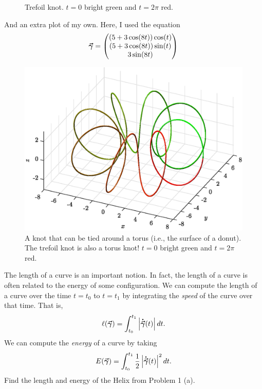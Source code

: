 \documentclass[12pt]{article} %
\begin{document}
\begin{solution}
\begin{enumerate}[(a)]
\begin{figure}[H]
        \caption{Trefoil knot. $t=0$ bright green and $t=2\pi$ red.}
    \end{figure}
\end{enumerate}
\item And an extra plot of my own. Here, I used the equation
\[
\boldsymbol{\vec{\gamma}} = \begin{pmatrix} (5+3\cos(8t))\cos(t) \\ (5+3\cos(8t))\sin(t) \\ 3\sin(8t) \end{pmatrix}
\]
\begin{figure}[H]
    \centering
    \includegraphics[width=.8\textwidth]{figures/torus_knot}
    \caption{A knot that can be tied around a torus (i.e., the surface of a donut). The trefoil knot is also a torus knot!  $t=0$ bright green and $t=2\pi$ red.}
\end{figure}
\end{solution}


\newpage
\begin{problem}
The length of a curve is an important notion. In fact, the length of a curve is often related to the energy of some configuration. We can compute the length of a curve over the time $t=t_0$ to $t=t_1$ by integrating the \emph{speed} of the curve over that time.  That is,
\[
\ell(\boldsymbol{\vec{\gamma}}) = \int_{t_0}^{t_1} \left|\boldsymbol{\dot{\vec{\gamma}}}(t)\right| d t.
\]
We can compute the \emph{energy} of a curve by taking
\[
E(\boldsymbol{\vec{\gamma}}) = \int_{t_0}^{t_1} \frac{1}{2} \left| \boldsymbol{\dot{\vec{\gamma}}}(t)\right|^2 d t.
\]
Find the length and energy of the Helix from Problem 1 (a).
\end{problem}
\end{document}
